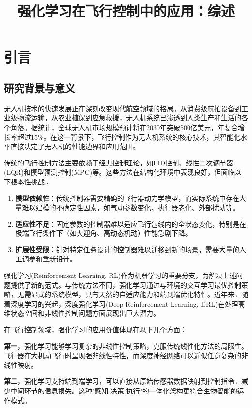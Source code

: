 \documentclass[12pt,a4paper]{ctexart}
\title{强化学习在飞行控制中的应用：综述}
\author{}
\date{}
\begin{document}
\maketitle
\tableofcontents
\newpage

\section{引言}
\subsection{研究背景与意义}

无人机技术的快速发展正在深刻改变现代航空领域的格局。从消费级航拍设备到工业级物流运输，从农业植保到应急救援，无人机系统已渗透到人类生产和生活的各个角落。据统计，全球无人机市场规模预计将在2030年突破500亿美元，年复合增长率超过15\%。在这一背景下，飞行控制作为无人机系统的核心技术，其智能化水平直接决定了无人机的性能边界和应用范围。

传统的飞行控制方法主要依赖于经典控制理论，如PID控制、线性二次调节器(LQR)和模型预测控制(MPC)等。这些方法在结构化环境中表现良好，但面临以下根本性挑战：

\begin{enumerate}
    \item \textbf{模型依赖性}：传统控制器需要精确的飞行器动力学模型，而实际系统中存在大量难以建模的不确定性因素，如气动参数变化、执行器老化、外部扰动等。
    \item \textbf{适应性不足}：固定参数的控制器难以适应飞行包线内的全状态变化，特别是在极端飞行条件下（如大迎角、高动态机动）性能急剧下降。
    \item \textbf{扩展性受限}：针对特定任务设计的控制器难以迁移到新的场景，需要大量的人工调参和重新设计。
\end{enumerate}

强化学习(Reinforcement Learning, RL)作为机器学习的重要分支，为解决上述问题提供了新的范式。与传统方法不同，强化学习通过与环境的交互学习最优控制策略，无需显式的系统模型，具有天然的自适应能力和端到端优化特性。近年来，随着深度学习的兴起，深度强化学习(Deep Reinforcement Learning, DRL)在处理高维状态空间和非线性控制问题方面展现出巨大潜力。

在飞行控制领域，强化学习的应用价值体现在以下几个方面：

\textbf{第一}，强化学习能够学习复杂的非线性控制策略，克服传统线性化方法的局限性。飞行器在大机动飞行时呈现强非线性特性，而深度神经网络可以近似任意复杂的非线性映射。

\textbf{第二}，强化学习支持端到端学习，可以直接从原始传感器数据映射到控制指令，减少中间环节的信息损失。这种"感知-决策-执行"的一体化架构更符合生物智能的运作模式。
\end{document}
